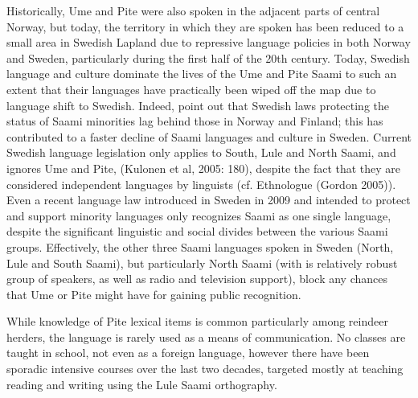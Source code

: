\documentclass[a4paper,12pt]{article}
\begin{document}
Historically, Ume and Pite were also spoken in the adjacent parts of central Norway, but today, the territory in which they are spoken has been reduced to a small area in Swedish Lapland due to repressive language policies in both Norway and Sweden, particularly during the first half of the 20th century. Today, Swedish language and culture dominate the lives of the Ume and Pite Saami to such an extent that their languages have practically been wiped off the map due to language shift to Swedish. Indeed, \citet[123]{blokland-etal2003} point out that Swedish laws protecting the status of Saami minorities lag behind those in Norway and Finland; this has contributed to a faster decline of Saami languages and culture in Sweden. Current Swedish language legislation only applies to South, Lule and North Saami, and ignores Ume and Pite, (Kulonen et al, 2005: 180), despite the fact that they are considered independent languages by linguists (cf. Ethnologue (Gordon 2005)). Even a recent language law introduced in Sweden in 2009 and intended to protect and support minority languages only recognizes Saami as one single language, despite the significant linguistic and social divides between the various Saami groups. Effectively, the other three Saami languages spoken in Sweden (North, Lule and South Saami), but particularly North Saami (with is relatively robust group of speakers, as well as radio and television support), block any chances that Ume or Pite might have for gaining public recognition. %

While knowledge of Pite lexical items is common particularly among reindeer herders, the language is rarely used as a means of communication. No classes are taught in school, not even as a foreign language, however there have been sporadic intensive courses over the last two decades, targeted mostly at teaching reading and writing using the Lule Saami orthography.

\end{document}
